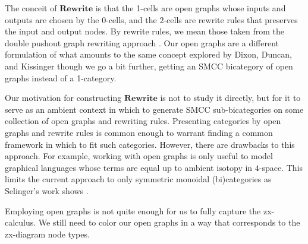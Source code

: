 \documentclass[./1--Catfying_zxCalc--Master.tex]{subfiles} %
\begin{document}
The conceit of $\mathbf{Rewrite}$ 
is that the 1-cells are open graphs 
whose inputs and outputs are 
chosen by the $0$-cells, 
and the $2$-cells are 
rewrite rules that preserves 
the input and output nodes.
By rewrite rules, we mean those 
taken from the 
double pushout graph rewriting 
approach \cite{Corradini_AlgApprGraphTrans}.
Our open graphs are 
a different formulation
of what amounts to the same concept
explored by Dixon, Duncan, and Kissinger
	\cite{Dixon_OpenGraphs}
though we go a bit further, 
getting an SMCC bicategory
of open graphs instead of a 1-category.
 
Our motivation for constructing $\mathbf{Rewrite}$ 
is not to study it directly, 
but for it to serve 
as an ambient context in which 
to generate SMCC sub-bicategories 
on some collection of open graphs 
and rewriting rules. 
Presenting categories by
open graphs and rewrite rules
is common enough
	\cite{Dixon_OpenGraphs,Fong_AlgOpenSystems,Pollard_OpenMarkov}
to warrant finding a common
framework in which to fit such categories.
However, there are drawbacks to this approach. 
For example, working with open graphs 
is only useful to model graphical languages 
whose terms are equal 
up to ambient isotopy in $4$-space.
This limits the current approach to 
only symmetric monoidal (bi)categories 
as Selinger's work shows
	\cite{Selinger_GraphicsMonCats}.
	
Employing open graphs is 
not quite enough for us
to fully capture the zx-calculus.
We still need to color
our open graphs in a way
that corresponds to the
zx-diagram node types.

 
% 
\end{document}
